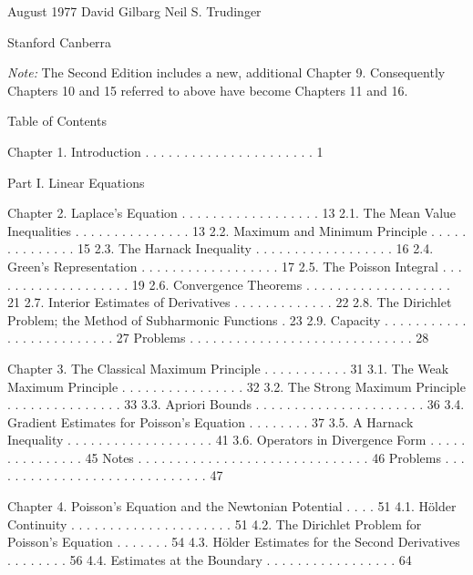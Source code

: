 \medskip

\noindent August 1977 \hfill David Gilbarg \hfill Neil S. Trudinger

\noindent Stanford \hfill Canberra

\bigskip

\noindent\hrulefill

\noindent \textit{Note:} The Second Edition includes a new, additional Chapter 9. Consequently Chapters 10 and 15 referred to above have become Chapters 11 and 16.


Table of Contents

Chapter 1. Introduction . . . . . . . . . . . . . . . . . . . . . . 1

Part I. Linear Equations

Chapter 2. Laplace’s Equation . . . . . . . . . . . . . . . . . . 13
  2.1.  The Mean Value Inequalities . . . . . . . . . . . . . . . 13
  2.2.  Maximum and Minimum Principle . . . . . . . . . . . . . . 15
  2.3.  The Harnack Inequality . . . . . . . . . . . . . . . . . . 16
  2.4.  Green’s Representation . . . . . . . . . . . . . . . . . . 17
  2.5.  The Poisson Integral . . . . . . . . . . . . . . . . . . . 19
  2.6.  Convergence Theorems . . . . . . . . . . . . . . . . . . . 21
  2.7.  Interior Estimates of Derivatives . . . . . . . . . . . . . 22
  2.8.  The Dirichlet Problem; the Method of Subharmonic Functions . 23
  2.9.  Capacity . . . . . . . . . . . . . . . . . . . . . . . . . 27
Problems . . . . . . . . . . . . . . . . . . . . . . . . . . . . . 28

Chapter 3.  The Classical Maximum Principle . . . . . . . . . . . 31
  3.1.  The Weak Maximum Principle . . . . . . . . . . . . . . . . 32
  3.2.  The Strong Maximum Principle . . . . . . . . . . . . . . . 33
  3.3.  Apriori Bounds . . . . . . . . . . . . . . . . . . . . . . 36
  3.4.  Gradient Estimates for Poisson’s Equation . . . . . . . . 37
  3.5.  A Harnack Inequality . . . . . . . . . . . . . . . . . . . 41
  3.6.  Operators in Divergence Form . . . . . . . . . . . . . . . 45
Notes . . . . . . . . . . . . . . . . . . . . . . . . . . . . . . 46
Problems . . . . . . . . . . . . . . . . . . . . . . . . . . . . . 47

Chapter 4.  Poisson’s Equation and the Newtonian Potential . . . . 51
  4.1.  Hölder Continuity . . . . . . . . . . . . . . . . . . . . . 51
  4.2.  The Dirichlet Problem for Poisson’s Equation . . . . . . . 54
  4.3.  Hölder Estimates for the Second Derivatives . . . . . . . . 56
  4.4.  Estimates at the Boundary . . . . . . . . . . . . . . . . . 64

